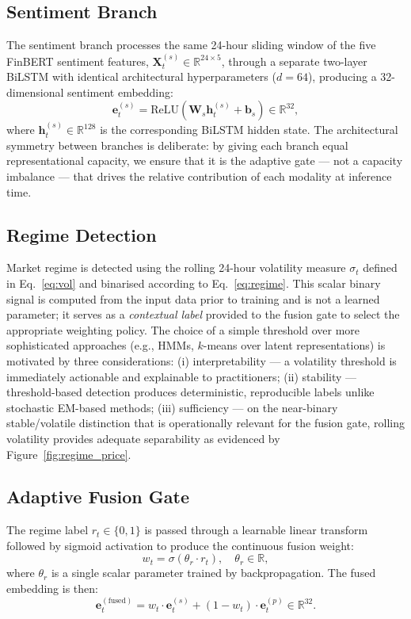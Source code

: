 \documentclass[journal]{IEEEtran}
\newcommand{\bilstm}{BiLSTM}
\begin{document}
\subsection{Sentiment Branch}
The sentiment branch processes the same 24-hour sliding window of the five
FinBERT sentiment features, $\mathbf{X}^{(s)}_t \in \mathbb{R}^{24 \times 5}$,
through a separate two-layer \bilstm{} with identical architectural
hyperparameters ($d=64$), producing a 32-dimensional sentiment embedding:
\begin{equation}
  \mathbf{e}^{(s)}_t = \mathrm{ReLU}\!\left(\mathbf{W}_s \mathbf{h}^{(s)}_t
  + \mathbf{b}_s\right) \in \mathbb{R}^{32},
  \label{eq:sent_emb}
\end{equation}
where $\mathbf{h}^{(s)}_t \in \mathbb{R}^{128}$ is the corresponding \bilstm{}
hidden state. The architectural symmetry between branches is deliberate: by
giving each branch equal representational capacity, we ensure that it is the
adaptive gate --- not a capacity imbalance --- that drives the relative
contribution of each modality at inference time.

\subsection{Regime Detection}
Market regime is detected using the rolling 24-hour volatility measure
$\sigma_t$ defined in Eq.~\eqref{eq:vol} and binarised according to
Eq.~\eqref{eq:regime}. This scalar binary signal is computed from the input
data prior to training and is not a learned parameter; it serves as a
\textit{contextual label} provided to the fusion gate to select the appropriate
weighting policy. The choice of a simple threshold over more sophisticated
approaches (e.g., HMMs, $k$-means over latent representations) is motivated
by three considerations:
(i) interpretability --- a volatility threshold is immediately actionable
and explainable to practitioners;
(ii) stability --- threshold-based detection produces deterministic, reproducible
labels unlike stochastic EM-based methods;
(iii) sufficiency --- on the near-binary stable/volatile distinction that is
operationally relevant for the fusion gate, rolling volatility provides
adequate separability as evidenced by Figure~\ref{fig:regime_price}.

\subsection{Adaptive Fusion Gate}
The regime label $r_t \in \{0, 1\}$ is passed through a learnable linear
transform followed by sigmoid activation to produce the continuous fusion weight:
\begin{equation}
  w_t = \sigma\!\left(\theta_r \cdot r_t\right), \quad \theta_r \in \mathbb{R},
  \label{eq:gate}
\end{equation}
where $\theta_r$ is a single scalar parameter trained by backpropagation.
The fused embedding is then:
\begin{equation}
  \mathbf{e}^{(\mathrm{fused})}_t = w_t \cdot \mathbf{e}^{(s)}_t
    + (1 - w_t) \cdot \mathbf{e}^{(p)}_t \in \mathbb{R}^{32}.
  \label{eq:fused}
\end{equation}
\end{document}
